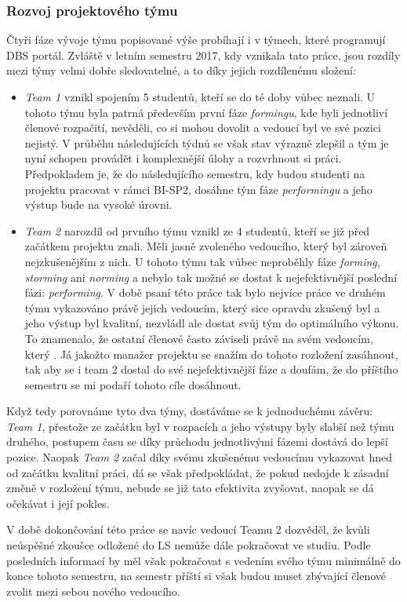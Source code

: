 \subsubsection{Rozvoj projektového týmu}
Čtyři fáze vývoje týmu popisované výše probíhají i v týmech, které programují DBS portál. Zvláště v letním semestru 2017, kdy vznikala tato práce, jsou rozdíly mezi týmy velmi dobře sledovatelné, a to díky jejich rozdílenému složení:
\begin{itemize}
	\item \emph{Team 1} vznikl spojením 5 studentů, kteří se do té doby vůbec neznali. U tohoto týmu byla patrná především první fáze \emph{formingu}, kde byli jednotliví členové rozpačití, nevěděli, co si mohou dovolit a vedoucí byl ve své pozici nejistý. V průběhu následujících týdnů se však stav výrazně zlepšil a tým je nyní schopen provádět i komplexnější úlohy a rozvrhnout si práci. Předpokladem je, že do následujícího semestru, kdy budou studenti na projektu pracovat v rámci BI-SP2, dosáhne tým fáze \emph{performingu} a jeho výstup bude na vysoké úrovni.
	\item \emph{Team 2} narozdíl od prvního týmu vznikl ze 4 studentů, kteří se již před začátkem projektu znali. Měli jasně zvoleného vedoucího, který byl zároveň nejzkušenějším z nich. U tohoto týmu tak vůbec neproběhly fáze \emph{forming}, \emph{storming} ani \emph{norming} a nebylo tak možné se dostat k nejefektivnější poslední fázi: \emph{performing}. V době psaní této práce tak bylo nejvíce práce ve druhém týmu vykazováno právě jejich vedoucím, který sice opravdu zkušený byl a jeho výstup byl kvalitní, nezvládl ale dostat svůj tým do optimálního výkonu. To znamenalo, že ostatní členové často záviseli právě na svém vedoucím, který . Já jakožto manažer projektu se snažím do tohoto rozložení zasáhnout, tak aby se i team 2 dostal do své nejefektivnější fáze a doufám, že do příštího semestru se mi podaří tohoto cíle dosáhnout.
\end{itemize}
Když tedy porovnáme tyto dva týmy, dostáváme se k jednoduchému závěru: \emph{Team 1}, přestože ze začátku byl v rozpacích a jeho výstupy byly slabší než týmu druhého, postupem času se díky průchodu jednotlivými fázemi dostává do lepší pozice. Naopak \emph{Team 2} začal díky svému zkušenému vedoucímu vykazovat hned od začátku kvalitní práci, dá se však předpokládat, že pokud nedojde k zásadní změně v rozložení týmu, nebude se již tato efektivita zvyšovat, naopak se dá očekávat i její pokles.

V době dokončování této práce se navíc vedoucí Teamu 2 dozvěděl, že kvůli neúspěšné zkoušce odložené do LS nemůže dále pokračovat ve studiu. Podle posledních informací by měl však pokračovat s vedením svého týmu minimálně do konce tohoto semestru, na semestr příští si však budou muset zbývající členové zvolit mezi sebou nového vedoucího.

